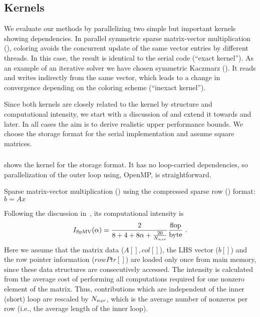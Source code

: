 \subsection{Kernels} \label{subsec:test_kernels}
We evaluate our methods by parallelizing two simple but important kernels showing \DTWO dependencies. In parallel symmetric sparse matrix-vector multiplication (\SymmSpmv), \DTWO coloring avoids the concurrent update of the same vector entries by different threads. In this case, the result is identical to the serial code (``exact kernel''). As an example of an iterative solver we have chosen symmetric Kaczmarz (\SYMMKACZ). It reads and writes indirectly from the same vector, which leads to a change in convergence depending on the coloring scheme (``inexact kernel'').

Since both kernels are closely related to the \SpMV kernel by structure and computational intensity, we start with a discussion of \SpMV and extend it towards \SymmSpmv and \SYMMKACZ later. In all cases the aim is to derive realistic upper performance bounds. We choose the \CRS storage format for the serial implementation and assume square matrices.

\subsubsection{\SpMV}
 shows the \SpMV kernel for the \CRS storage format. It has no loop-carried dependencies, so parallelization of the outer loop using, \eg OpenMP, is straightforward. 
\begin{algorithm}[tbp]
	\caption{Sparse matrix-vector multiplication (\SpMV) using the compressed sparse row (\CRS) format: $b=A x$} 
	\label{alg:SpMV}
	\begin{algorithmic}[1]
		\ENDFOR
		\ENDFOR
	\end{algorithmic}
\end{algorithm}
Following the discussion in~\cite{Moritz_sell}, its computational intensity is
\begin{equation}
\label{eq:SpMV_intensity}
I_\mathrm{\SpMV} (\alpha)= \frac{2}{8+4+8\alpha+\frac{20}{\NNZRmath}} \frac{\FLOP}{\BYTE}\eos
\end{equation}
Here we assume that the matrix data  ($A[], col[]$), the LHS vector ($b[]$) and the row pointer information ($rowPtr[]$) are loaded only once from main memory, since these data structures are consecutively accessed. The intensity is calculated from the average cost of performing all computations required for one nonzero element of the matrix. Thus, contributions which are independent of the inner (short) loop are rescaled by $N_{nzr}$, which is the average number of nonzeros per row (i.e., the average length of the inner loop).

